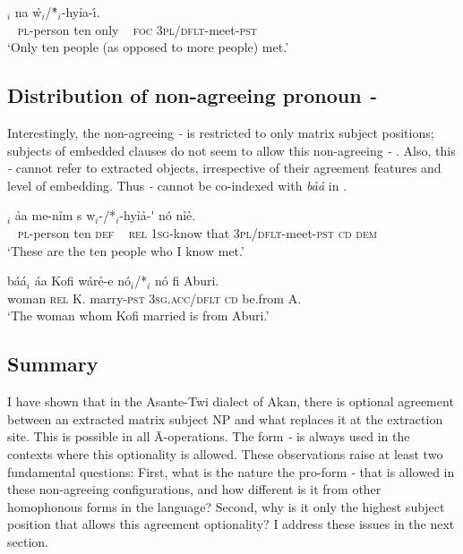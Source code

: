 \documentclass[output=paper]{LSP/langsci}
\begin{document}
\ex\label{ex:korsah:20b}
\gll [ N-ny{\'{i}}p{\'{a}} d{\'{u}} p{\'{\eer}} ]$_i$ na  w\h \oor$_i$/*\h \oor$_i$-hy\h ia-{\'{\i}}.\\
~  \textsc{pl-}person ten only ~ \textsc{foc} \textsc{3pl}/\textsc{dflt}-meet-\textsc{pst}\\
\glt  `Only ten people (as opposed to more people) met.'

\z
\z


\subsection{Distribution of non-agreeing pronoun \textit{\eer-}}\label{sec:korsah:3.2}
    
Interestingly, the non-agreeing \textit{\eer-} is restricted to only matrix subject positions; subjects of embedded clauses do not seem to allow this non-agreeing \textit{\eer-} . Also, this \textit{\eer-} cannot refer to extracted  objects, irrespective of their agreement features and level of embedding. Thus \textit{\eer-} cannot be co-indexed with \textit{\oor b\h a\h a} in . 
  


\ea\label{ex:korsah:21}  
\ea\label{ex:korsah:21a}
\gll [ N-n{\'{i}}p{\'{a}} d{\'{u}} n{\'{o}} ]$_i$ \h aa  me-n\h im {s\eer} w\oor$_i$-/*\eer$_i$-hy\h i\h a-{\'{\eer}}  n{\'{o}} n\h i\h e.\\
  ~ \textsc{pl}-person ten \textsc{def} ~ \textsc{rel}  \textsc{1sg}-know that \textsc{3pl}/\textsc{dflt}-meet-\textsc{pst} \textsc{cd} \textsc{dem}\\
\glt  `These are the ten people who I know met.'

\ex\label{ex:korsah:21b}
\gll \scalebox{1.5}{\oor}b{\'{a}}{\'{a}}$_i$  {\'{a}}a Kofi w{\'{a}}r\h e-e  n{\'{o}}$_i$/*\eer$_i$ n{\'{o}}  fi Aburi.\\
 woman \textsc{rel} K. marry-\textsc{pst} \textsc{3sg.acc}/\textsc{dflt} \textsc{cd} be.from A.\\
\glt  `The woman whom Kofi married is from Aburi.'

\z
\z



\subsection{Summary}\label{sec:korsah:3.3}

I have shown that in the Asante-Twi dialect of Akan, there is optional agreement between an extracted matrix subject NP and what replaces it at the extraction site. This is possible in all \=A-operations. The form \textit{\eer-} is always used in the contexts where this optionality is allowed. These observations raise at least two fundamental questions: First, what is the  nature the pro-form \textit{\eer-} that is allowed in these non-agreeing configurations, and how different is it from other homophonous forms in the language? Second, why is it only the highest subject position that allows this agreement optionality? I address these issues in the next section.
    
\end{document}
